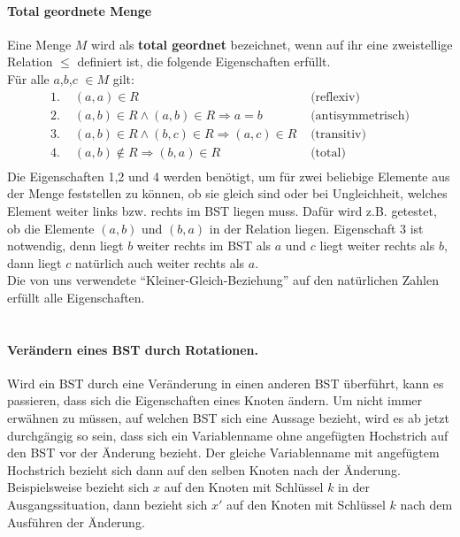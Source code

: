 \documentclass[a4paper,12pt]{article}
\begin{document}
\paragraph{Total geordnete Menge} 
Eine Menge $M$ wird als \textbf{total geordnet} bezeichnet, wenn auf ihr eine zweistellige Relation $\leq$ definiert ist, die folgende Eigenschaften erfüllt.\\
Für alle $a$,$b$,$c$ $\in M$ gilt:
\begin{align*}
\text{1. } & (a,a) \in R  &\text{  (reflexiv)}\\
\text{2. } & (a,b) \in R  \land  (a,b) \in R \Rightarrow a = b  &\text{  (antisymmetrisch)}\\
\text{3. } & (a,b) \in R  \land  (b,c) \in R \Rightarrow  (a,c) \in R  &\text{  (transitiv)}\\
\text{4. } & (a,b) \notin R \Rightarrow  (b,a) \in R   &\text{  (total)}\\
\end{align*}
Die Eigenschaften 1,2 und 4 werden benötigt, um für zwei beliebige Elemente aus der Menge feststellen zu können, ob sie gleich sind oder bei Ungleichheit, welches Element weiter links bzw. rechts im BST liegen muss. Dafür wird z.B. getestet, ob die Elemente $(a,b)$ und $(b, a)$ in der Relation liegen. Eigenschaft 3 ist notwendig, denn liegt $b$ weiter rechts im BST als $a$ und $c$ liegt weiter rechts als $b$, dann liegt $c$ natürlich auch weiter rechts als $a$. \\
Die von uns verwendete \enquote{Kleiner-Gleich-Beziehung} auf den natürlichen Zahlen erfüllt alle Eigenschaften.
\\
\\




\paragraph{Verändern eines BST durch Rotationen.}
Wird ein BST durch eine Veränderung in einen anderen BST überführt, kann es passieren, dass sich die Eigenschaften eines Knoten ändern. Um nicht immer erwähnen zu müssen, auf welchen BST sich eine Aussage bezieht, wird es ab jetzt durchgängig so sein, dass sich ein Variablenname ohne angefügten Hochstrich auf den BST vor der Änderung bezieht. Der gleiche Variablenname mit angefügtem Hochstrich bezieht sich dann auf den selben Knoten nach der Änderung. Beispielsweise bezieht sich $x$ auf den Knoten mit Schlüssel $k$ in der Ausgangssituation, dann bezieht sich $x'$ auf den Knoten mit Schlüssel $k$ nach dem Ausführen der Änderung. \\
\end{document}
